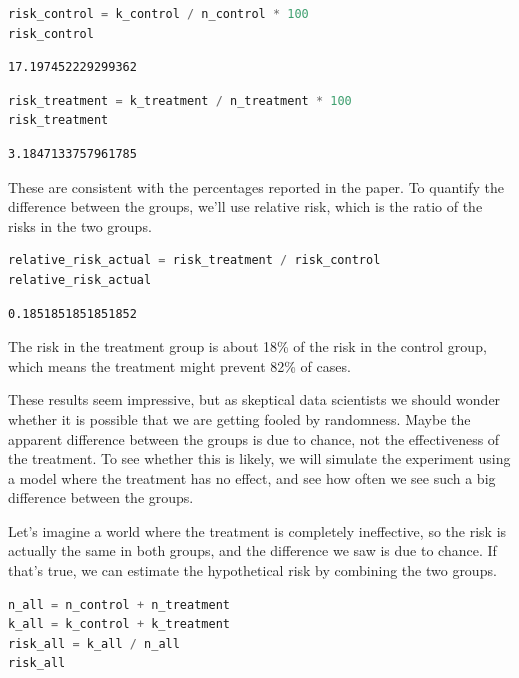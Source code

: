 \begin{lstlisting}[language=Python,style=source]
risk_control = k_control / n_control * 100
risk_control
\end{lstlisting}

\begin{lstlisting}[style=output]
17.197452229299362
\end{lstlisting}

\begin{lstlisting}[language=Python,style=source]
risk_treatment = k_treatment / n_treatment * 100
risk_treatment
\end{lstlisting}

\begin{lstlisting}[style=output]
3.1847133757961785
\end{lstlisting}

These are consistent with the percentages reported in the paper. To
quantify the difference between the groups, we'll use relative risk,
which is the ratio of the risks in the two groups.

\begin{lstlisting}[language=Python,style=source]
relative_risk_actual = risk_treatment / risk_control
relative_risk_actual
\end{lstlisting}

\begin{lstlisting}[style=output]
0.1851851851851852
\end{lstlisting}

The risk in the treatment group is about 18\% of the risk in the control
group, which means the treatment might prevent 82\% of cases.

These results seem impressive, but as skeptical data scientists we
should wonder whether it is possible that we are getting fooled by
randomness. Maybe the apparent difference between the groups is due to
chance, not the effectiveness of the treatment. To see whether this is
likely, we will simulate the experiment using a model where the
treatment has no effect, and see how often we see such a big difference
between the groups.

Let's imagine a world where the treatment is completely ineffective, so
the risk is actually the same in both groups, and the difference we saw
is due to chance. If that's true, we can estimate the hypothetical risk
by combining the two groups.

\begin{lstlisting}[language=Python,style=source]
n_all = n_control + n_treatment
k_all = k_control + k_treatment
risk_all = k_all / n_all
risk_all
\end{lstlisting}

